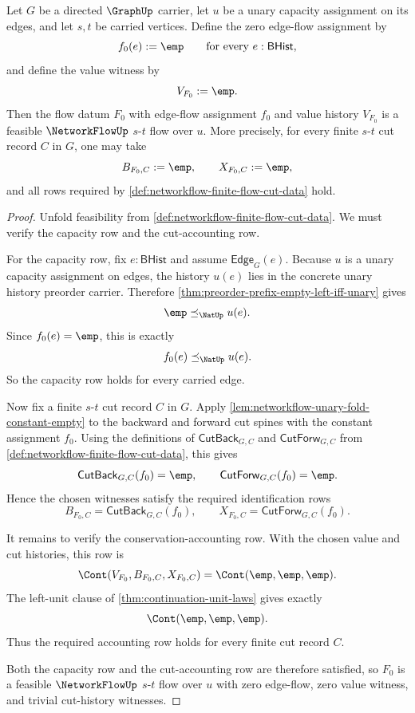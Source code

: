 \begin{theorem}
\label{thm:networkflow-zero-edge-flow-feasible}
Let $G$ be a directed $\GraphUp$ carrier, let $u$ be a unary capacity assignment on its edges, and let $s,t$ be carried vertices. Define the zero edge-flow assignment by
$$
f_0(e):=\emp
\qquad\text{for every }e:\mathsf{BHist},
$$
and define the value witness by
$$
V_{F_0}:=\emp.
$$
Then the flow datum $F_0$ with edge-flow assignment $f_0$ and value history $V_{F_0}$ is a feasible $\NetworkFlowUp$ $s$-$t$ flow over $u$. More precisely, for every finite $s$-$t$ cut record $C$ in $G$, one may take
$$
B_{F_0,C}:=\emp,
\qquad
X_{F_0,C}:=\emp,
$$
and all rows required by \autoref{def:networkflow-finite-flow-cut-data} hold.
\end{theorem}
\begin{proof}
Unfold feasibility from \autoref{def:networkflow-finite-flow-cut-data}. We must verify the capacity row and the cut-accounting row.

For the capacity row, fix $e:\mathsf{BHist}$ and assume $\mathsf{Edge}_G(e)$. Because $u$ is a unary capacity assignment on edges, the history $u(e)$ lies in the concrete unary history preorder carrier. Therefore \autoref{thm:preorder-prefix-empty-left-iff-unary} gives
$$
\emp\preceq_{\NatUp}u(e).
$$
Since $f_0(e)=\emp$, this is exactly
$$
f_0(e)\preceq_{\NatUp}u(e).
$$
So the capacity row holds for every carried edge.

Now fix a finite $s$-$t$ cut record $C$ in $G$. Apply \autoref{lem:networkflow-unary-fold-constant-empty} to the backward and forward cut spines with the constant assignment $f_0$. Using the definitions of $\mathsf{CutBack}_{G,C}$ and $\mathsf{CutForw}_{G,C}$ from \autoref{def:networkflow-finite-flow-cut-data}, this gives
$$
\mathsf{CutBack}_{G,C}(f_0)=\emp,
\qquad
\mathsf{CutForw}_{G,C}(f_0)=\emp.
$$
Hence the chosen witnesses satisfy the required identification rows
$$
B_{F_0,C}=\mathsf{CutBack}_{G,C}(f_0),
\qquad
X_{F_0,C}=\mathsf{CutForw}_{G,C}(f_0).
$$

It remains to verify the conservation-accounting row. With the chosen value and cut histories, this row is
$$
\Cont(V_{F_0},B_{F_0,C},X_{F_0,C})
=
\Cont(\emp,\emp,\emp).
$$
The left-unit clause of \autoref{thm:continuation-unit-laws} gives exactly
$$
\Cont(\emp,\emp,\emp).
$$
Thus the required accounting row holds for every finite cut record $C$.

Both the capacity row and the cut-accounting row are therefore satisfied, so $F_0$ is a feasible $\NetworkFlowUp$ $s$-$t$ flow over $u$ with zero edge-flow, zero value witness, and trivial cut-history witnesses.
\end{proof}

